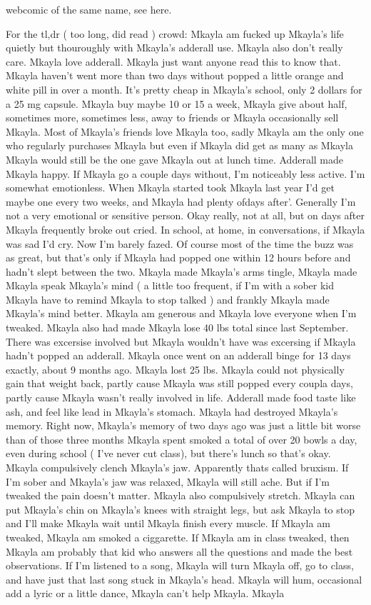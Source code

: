 \documentclass[12pt]{book}
\begin{document}
webcomic of the same name, see here.



For the tl,dr ( too long, did read ) crowd: Mkayla am fucked up Mkayla's life quietly but thouroughly with Mkayla's adderall use. Mkayla also don't really care. Mkayla love adderall. Mkayla just want anyone read this to know that. Mkayla haven't went more than two days without popped a little orange and white pill in over a month. It's pretty cheap in Mkayla's school, only 2 dollars for a 25 mg capsule. Mkayla buy maybe 10 or 15 a week, Mkayla give about half, sometimes more, sometimes less, away to friends or Mkayla occasionally sell Mkayla. Most of Mkayla's friends love Mkayla too, sadly Mkayla am the only one who regularly purchases Mkayla but even if Mkayla did get as many as Mkayla Mkayla would still be the one gave Mkayla out at lunch time. Adderall made Mkayla happy. If Mkayla go a couple days without, I'm noticeably less active. I'm somewhat emotionless. When Mkayla started took Mkayla last year I'd get maybe one every two weeks, and Mkayla had plenty ofdays after'. Generally I'm not a very emotional or sensitive person. Okay really, not at all, but on days after Mkayla frequently broke out cried. In school, at home, in conversations, if Mkayla was sad I'd cry. Now I'm barely fazed. Of course most of the time the buzz was as great, but that's only if Mkayla had popped one within 12 hours before and hadn't slept between the two. Mkayla made Mkayla's arms tingle, Mkayla made Mkayla speak Mkayla's mind ( a little too frequent, if I'm with a sober kid Mkayla have to remind Mkayla to stop talked ) and frankly Mkayla made Mkayla's mind better. Mkayla am generous and Mkayla love everyone when I'm tweaked. Mkayla also had made Mkayla lose 40 lbs total since last September. There was excersise involved but Mkayla wouldn't have was excersing if Mkayla hadn't popped an adderall. Mkayla once went on an adderall binge for 13 days exactly, about 9 months ago. Mkayla lost 25 lbs. Mkayla could not physically gain that weight back, partly cause Mkayla was still popped every coupla days, partly cause Mkayla wasn't really involved in life. Adderall made food taste like ash, and feel like lead in Mkayla's stomach. Mkayla had destroyed Mkayla's memory. Right now, Mkayla's memory of two days ago was just a little bit worse than of those three months Mkayla spent smoked a total of over 20 bowls a day, even during school ( I've never cut class), but there's lunch so that's okay. Mkayla compulsively clench Mkayla's jaw. Apparently thats called bruxism. If I'm sober and Mkayla's jaw was relaxed, Mkayla will still ache. But if I'm tweaked the pain doesn't matter. Mkayla also compulsively stretch. Mkayla can put Mkayla's chin on Mkayla's knees with straight legs, but ask Mkayla to stop and I'll make Mkayla wait until Mkayla finish every muscle. If Mkayla am tweaked, Mkayla am smoked a ciggarette. If Mkayla am in class tweaked, then Mkayla am probably that kid who answers all the questions and made the best observations. If I'm listened to a song, Mkayla will turn Mkayla off, go to class, and have just that last song stuck in Mkayla's head. Mkayla will hum, occasional add a lyric or a little dance, Mkayla can't help Mkayla. Mkayla 
\end{document}
